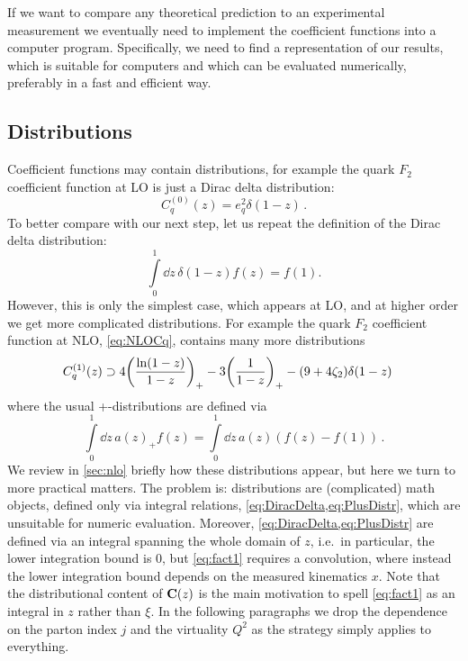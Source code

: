 If we want to compare any theoretical prediction to an experimental measurement we eventually need to implement the coefficient functions into a computer program.
Specifically, we need to find a representation of our results, which is suitable for computers and which can be evaluated numerically, preferably in a fast and efficient way.

\subsection{Distributions}
\label{sec:rsl}

Coefficient functions may contain distributions, for example the quark $F_2$ coefficient function at LO is just a Dirac delta distribution:
\begin{equation}
    C_q^{(0)}(z) = e_q^2 \delta(1-z) \,.
\end{equation}
To better compare with our next step, let us repeat the definition of the Dirac delta distribution:
\begin{equation}
    \int\limits_0^1 \! \dd z\, \delta(1-z) f(z) = f(1). \label{eq:DiracDelta}
\end{equation}
However, this is only the simplest case, which appears at LO, and at higher order we get more complicated distributions.
For example the quark $F_2$ coefficient function at NLO, \cref{eq:NLOCq}, contains many more distributions
\begin{align}
    C_q^{(1)}(z) &\supset 4 \qty(\frac{\ln(1-z)}{1-z})_+ - 3 \qty(\frac{1}{1-z})_+ - \qty(9+4\zeta_2)\delta(1-z)
\end{align}
where the usual +-distributions are defined via
\begin{equation}
    \int\limits_0^1 \! \dd z\, a(z)_+ f(z) = \int\limits_0^1 \! \dd z\, a(z) \left(f(z) - f(1)\right) \,. \label{eq:PlusDistr}
\end{equation}
We review in \cref{sec:nlo} briefly how these distributions appear, but here we turn to more practical matters.
The problem is: distributions are (complicated) math objects, defined only via integral relations, \cref{eq:DiracDelta,eq:PlusDistr}, which are unsuitable for numeric evaluation.
Moreover, \cref{eq:DiracDelta,eq:PlusDistr} are defined via an integral spanning the whole domain of $z$, i.e.\ in particular, the lower integration bound is 0, but \cref{eq:fact1} requires a convolution, where instead the lower integration bound depends on the measured kinematics $x$.
Note that the distributional content of $\vb C(z)$ is the main motivation to spell \cref{eq:fact1} as an integral in $z$ rather than $\xi$.
In the following paragraphs we drop the dependence on the parton index $j$ and the virtuality $Q^2$ as the strategy simply applies to everything.

